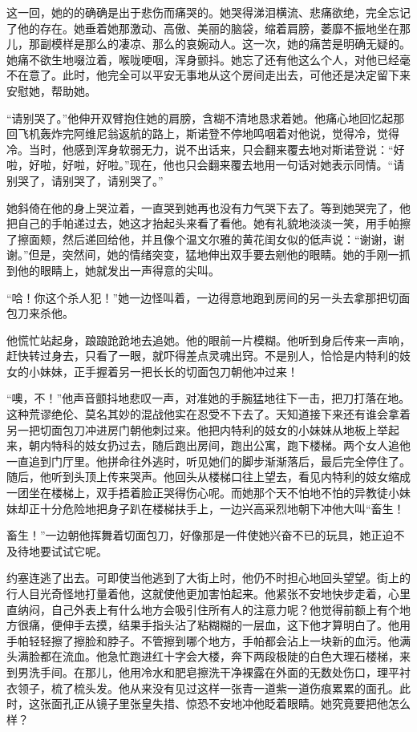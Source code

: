     这一回，她的的确确是出于悲伤而痛哭的。她哭得涕泪横流、悲痛欲绝，完全忘记了他的存在。她垂着她那激动、高傲、美丽的脑袋，缩着肩膀，萎靡不振地坐在那儿，那副模样是那么的凄凉、那么的哀婉动人。这一次，她的痛苦是明确无疑的。她痛不欲生地啜泣着，喉咙哽咽，浑身颤抖。她忘了还有他这么个人，对他已经毫不在意了。此时，他完全可以平安无事地从这个房间走出去，可他还是决定留下来安慰她，帮助她。

 


    “请别哭了。”他伸开双臂抱住她的肩膀，含糊不清地恳求着她。他痛心地回忆起那回飞机轰炸完阿维尼翁返航的路上，斯诺登不停地鸣咽着对他说，觉得冷，觉得冷。当时，他感到浑身软弱无力，说不出话来，只会翻来覆去地对斯诺登说：“好啦，好啦，好啦，好啦。”现在，他也只会翻来覆去地用一句话对她表示同情。“请别哭了，请别哭了，请别哭了。”

    她斜倚在他的身上哭泣着，一直哭到她再也没有力气哭下去了。等到她哭完了，他把自己的手帕递过去，她这才抬起头来看了看他。她有礼貌地淡淡一笑，用手帕擦了擦面颊，然后递回给他，并且像个温文尔雅的黄花闺女似的低声说：“谢谢，谢谢。”但是，突然间，她的情绪突变，猛地伸出双手要去剜他的眼睛。她的手刚一抓到他的眼睛上，她就发出一声得意的尖叫。

    “哈！你这个杀人犯！”她一边怪叫着，一边得意地跑到房间的另一头去拿那把切面包刀来杀他。

    他慌忙站起身，踉踉跄跄地去追她。他的眼前一片模糊。他听到身后传来一声响，赶快转过身去，只看了一眼，就吓得差点灵魂出窍。不是别人，恰恰是内特利的妓女的小妹妹，正手握着另一把长长的切面包刀朝他冲过来！

    “噢，不！”他声音颤抖地悲叹一声，对准她的手腕猛地往下一击，把刀打落在地。这种荒谬绝伦、莫名其妙的混战他实在忍受不下去了。天知道接下来还有谁会拿着另一把切面包刀冲进房门朝他刺过来。他把内特利的妓女的小妹妹从地板上举起来，朝内特科的妓女扔过去，随后跑出房间，跑出公寓，跑下楼梯。两个女人追他一直追到门厅里。他拼命往外逃时，听见她们的脚步渐渐落后，最后完全停住了。随后，他听到头顶上传来哭声。他回头从楼梯口往上望去，看见内特利的妓女缩成一团坐在楼梯上，双手捂着脸正哭得伤心呢。而她那个天不怕地不怕的异教徒小妹妹却正十分危险地把身子趴在楼梯扶手上，一边兴高采烈地朝下冲他大叫“畜生！

    畜生！”一边朝他挥舞着切面包刀，好像那是一件使她兴奋不已的玩具，她正迫不及待地要试试它呢。

    约塞连逃了出去。可即使当他逃到了大街上时，他仍不时担心地回头望望。街上的行人目光奇怪地打量着他，这就使他更加害怕起来。他紧张不安地快步走着，心里直纳闷，自己外表上有什么地方会吸引住所有人的注意力呢？他觉得前额上有个地方很痛，便伸手去摸，结果手指头沾了粘糊糊的一层血，这下他才算明白了。他用手帕轻轻擦了擦脸和脖子。不管擦到哪个地方，手帕都会沾上一块新的血污。他满头满脸都在流血。他急忙跑进红十字会大楼，奔下两段极陡的白色大理石楼梯，来到男洗手间。在那儿，他用冷水和肥皂擦洗干净裸露在外面的无数处伤口，理平衬衣领子，梳了梳头发。他从来没有见过这样一张青一道紫一道伤痕累累的面孔。此时，这张面孔正从镜子里张皇失措、惊恐不安地冲他眨着眼睛。她究竟要把他怎么样？

